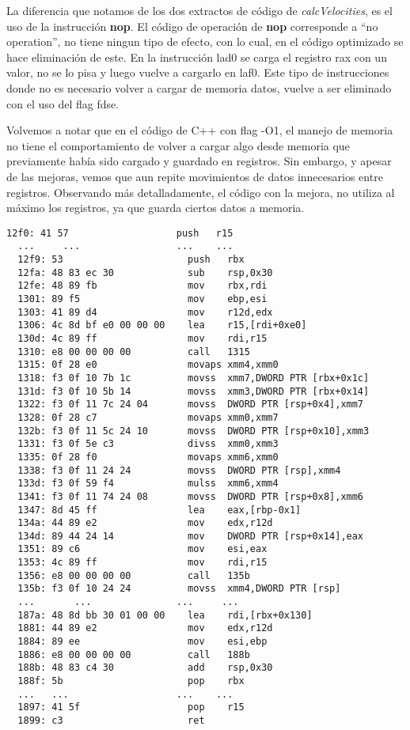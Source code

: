 La diferencia que notamos de los dos extractos de código de \textit{calcVelocities}, es el uso de la instrucción \textbf{nop}. El código de operación de \textbf{nop} corresponde a ``no operation'', no tiene ningun tipo de efecto, con lo cual, en el código optimizado se hace eliminación de este.
En la instrucción lad0 se carga el registro rax con un valor, no se lo pisa y luego vuelve a cargarlo en laf0. Este tipo de instrucciones donde no es necesario volver a cargar de memoria datos, vuelve a ser eliminado con el uso del flag fdse.

Volvemos a notar que en el código de C++ con flag -O1, el manejo de memoria no tiene el comportamiento de volver a cargar algo desde memoria que previamente había sido cargado y guardado en registros. Sin embargo, y apesar de las mejoras, vemos que aun repite movimientos de datos innecesarios entre registros.
Observando más detalladamente, el código con la mejora, no utiliza al máximo los registros, ya que guarda ciertos datos a memoria.


\begin{lstlisting}[title=Función calcVelocities con optimización -O1]
  12f0:	41 57                	push   r15
  ...     ...                 ...    ...
  12f9:	53                   	push   rbx
  12fa:	48 83 ec 30          	sub    rsp,0x30
  12fe:	48 89 fb             	mov    rbx,rdi
  1301:	89 f5                	mov    ebp,esi
  1303:	41 89 d4             	mov    r12d,edx
  1306:	4c 8d bf e0 00 00 00 	lea    r15,[rdi+0xe0]
  130d:	4c 89 ff             	mov    rdi,r15
  1310:	e8 00 00 00 00       	call   1315
  1315:	0f 28 e0             	movaps xmm4,xmm0
  1318:	f3 0f 10 7b 1c       	movss  xmm7,DWORD PTR [rbx+0x1c]
  131d:	f3 0f 10 5b 14       	movss  xmm3,DWORD PTR [rbx+0x14]
  1322:	f3 0f 11 7c 24 04    	movss  DWORD PTR [rsp+0x4],xmm7
  1328:	0f 28 c7             	movaps xmm0,xmm7
  132b:	f3 0f 11 5c 24 10    	movss  DWORD PTR [rsp+0x10],xmm3
  1331:	f3 0f 5e c3          	divss  xmm0,xmm3
  1335:	0f 28 f0             	movaps xmm6,xmm0
  1338:	f3 0f 11 24 24       	movss  DWORD PTR [rsp],xmm4
  133d:	f3 0f 59 f4          	mulss  xmm6,xmm4
  1341:	f3 0f 11 74 24 08    	movss  DWORD PTR [rsp+0x8],xmm6
  1347:	8d 45 ff             	lea    eax,[rbp-0x1]
  134a:	44 89 e2             	mov    edx,r12d
  134d:	89 44 24 14          	mov    DWORD PTR [rsp+0x14],eax
  1351:	89 c6                	mov    esi,eax
  1353:	4c 89 ff             	mov    rdi,r15
  1356:	e8 00 00 00 00       	call   135b
  135b:	f3 0f 10 24 24       	movss  xmm4,DWORD PTR [rsp]
  ...       ...               ...     ...
  187a:	48 8d bb 30 01 00 00 	lea    rdi,[rbx+0x130]
  1881:	44 89 e2             	mov    edx,r12d
  1884:	89 ee                	mov    esi,ebp
  1886:	e8 00 00 00 00       	call   188b 
  188b:	48 83 c4 30          	add    rsp,0x30
  188f:	5b                   	pop    rbx
  ...   ...                   ...    ...
  1897:	41 5f                	pop    r15
  1899:	c3                   	ret 
\end{lstlisting}


